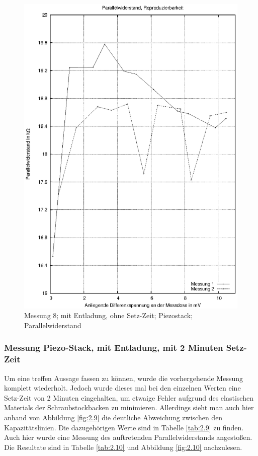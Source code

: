 \documentclass[12pt]{scrreprt} %
\begin{document}
\begin {figure}[htbp]
      \begin{center}
        \includegraphics{tabelle2_2_3}
      \end{center}
\caption{Messung 8; mit Entladung, ohne Setz-Zeit; Piezostack; Parallelwiderstand}
\label{fig:2.8}
\end{figure}

\newpage
\subsubsection{Messung Piezo-Stack, mit Entladung, mit 2 Minuten Setz-Zeit}
Um eine treffen Aussage fassen zu können, wurde die vorhergehende Messung komplett wiederholt. Jedoch wurde dieses mal bei den einzelnen Werten eine Setz-Zeit von 2 Minuten eingehalten, um etwaige Fehler aufgrund des elastischen Materials der Schraubstockbacken zu minimieren. Allerdings sieht man auch hier anhand von Abbildung \vref{fig:2.9} die deutliche Abweichung zwischen den Kapazitätslinien. Die dazugehörigen Werte sind in Tabelle \vref{tab:2.9} zu finden.\\
Auch hier wurde eine Messung des auftretenden Parallelwiderstands angestoßen. Die Resultate sind in Tabelle \vref{tab:2.10} und Abbildung \vref{fig:2.10} nachzulesen.
\end{document}
